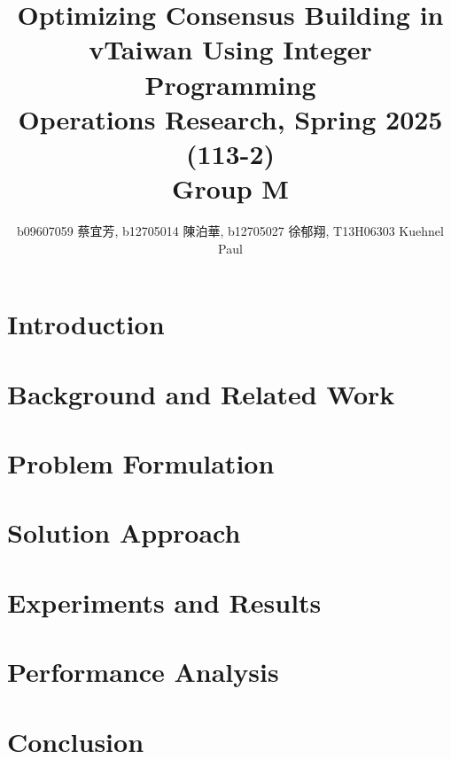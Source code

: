 \documentclass[11pt]{article}
\title{Optimizing Consensus Building in vTaiwan Using Integer Programming \\
\large Operations Research, Spring 2025 (113-2) \\ Group M}
\author{b09607059 {\chinesefont 蔡宜芳}, b12705014 {\chinesefont 陳泊華},
    b12705027 {\chinesefont 徐郁翔}, T13H06303 Kuehnel Paul}
\affil{Department of Information Management, National Taiwan University}
\begin{document}
\maketitle


\setlength{\parindent}{0pt}
\linespread{0.93}  %
\setlength{\parskip}{0.5em}  %

\section{Introduction}\label{sec:intro}


\section{Background and Related Work}\label{sec:background}


\section{Problem Formulation}\label{sec:problem_formulation}


%

\section{Solution Approach}\label{sec:solution}


\section{Experiments and Results}\label{sec:experiments}


\section{Performance Analysis}\label{sec:performance}


\section{Conclusion}\label{sec:conclusion}


\printbibliography
\end{document}
